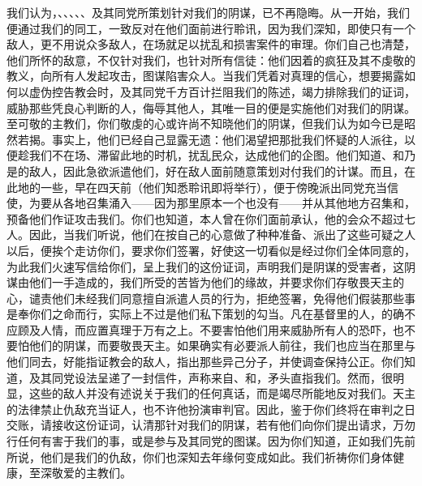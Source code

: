 我们认为，、、、、、及其同党所策划针对我们的阴谋，已不再隐晦。从一开始，我们便通过我们的同工，一致反对在他们面前进行聆讯，因为我们深知，即使只有一个敌人，更不用说众多敌人，在场就足以扰乱和损害案件的审理。你们自己也清楚，他们所怀的敌意，不仅针对我们，也针对所有信徒：他们因着的疯狂及其不虔敬的教义，向所有人发起攻击，图谋陷害众人。当我们凭着对真理的信心，想要揭露如何以虚伪控告教会时，及其同党千方百计拦阻我们的陈述，竭力排除我们的证词，威胁那些凭良心判断的人，侮辱其他人，其唯一目的便是实施他们对我们的阴谋。至可敬的主教们，你们敬虔的心或许尚不知晓他们的阴谋，但我们认为如今已是昭然若揭。事实上，他们已经自己显露无遗：他们渴望把那批我们怀疑的人派往，以便趁我们不在场、滞留此地的时机，扰乱民众，达成他们的企图。他们知道、和乃是的敌人，因此急欲派遣他们，好在敌人面前随意策划对付我们的计谋。而且，在此地的一些，早在四天前（他们知悉聆讯即将举行），便于傍晚派出同党充当信使，为要从各地召集涌入——因为那里原本一个也没有——并从其他地方召集和，预备他们作证攻击我们。你们也知道，本人曾在你们面前承认，他的会众不超过七人。因此，当我们听说，他们在按自己的心意做了种种准备、派出了这些可疑之人以后，便挨个走访你们，要求你们签署，好使这一切看似是经过你们全体同意的，为此我们火速写信给你们，呈上我们的这份证词，声明我们是阴谋的受害者，这阴谋由他们一手造成的，我们所受的苦皆为他们的缘故，并要求你们存敬畏天主的心，谴责他们未经我们同意擅自派遣人员的行为，拒绝签署，免得他们假装那些事是奉你们之命而行，实际上不过是他们私下策划的勾当。凡在基督里的人，的确不应顾及人情，而应置真理于万有之上。不要害怕他们用来威胁所有人的恐吓，也不要怕他们的阴谋，而要敬畏天主。如果确实有必要派人前往，我们也应当在那里与他们同去，好能指证教会的敌人，指出那些异己分子，并使调查保持公正。你们知道，及其同党设法呈递了一封信件，声称来自、和，矛头直指我们。然而，很明显，这些的敌人并没有述说关于我们的任何真话，而是竭尽所能地反对我们。天主的法律禁止仇敌充当证人，也不许他扮演审判官。因此，鉴于你们终将在审判之日交账，请接收这份证词，认清那针对我们的阴谋，若有他们向你们提出请求，万勿行任何有害于我们的事，或是参与及其同党的图谋。因为你们知道，正如我们先前所说，他们是我们的仇敌，你们也深知去年缘何变成如此。我们祈祷你们身体健康，至深敬爱的主教们。\par

